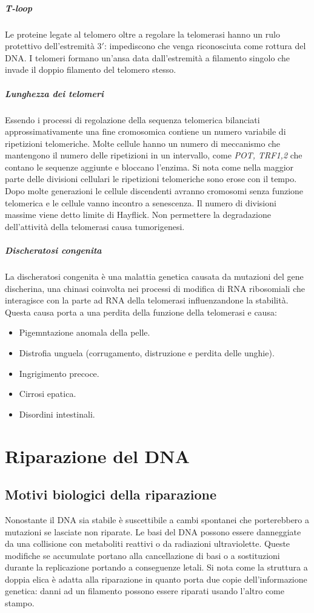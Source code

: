 				\subparagraph{T-loop}
				Le proteine legate al telomero oltre a regolare la telomerasi hanno un rulo protettivo dell'estremit\`a $3'$: impediscono che venga riconosciuta come rottura del DNA.
				I telomeri formano un'ansa data dall'estremit\`a a filamento singolo che invade il doppio filamento del telomero stesso.

				\subparagraph{Lunghezza dei telomeri}
				Essendo i processi di regolazione della sequenza telomerica bilanciati approssimativamente una fine cromosomica contiene un numero variabile di ripetizioni telomeriche.
				Molte cellule hanno un numero di meccanismo che mantengono il numero delle ripetizioni in un intervallo, come \emph{POT, TRF1,2} che contano le sequenze aggiunte e bloccano l'enzima.
				Si nota come nella maggior parte delle divisioni cellulari le ripetizioni telomeriche sono erose con il tempo.
				Dopo molte generazioni le cellule discendenti avranno cromosomi senza funzione telomerica e le cellule vanno incontro a senescenza.
				Il numero di divisioni massime viene detto limite di Hayflick.
				Non permettere la degradazione dell'attivit\`a della telomerasi causa tumorigenesi.

				\subparagraph{Discheratosi congenita}
				La discheratosi congenita \`e una malattia genetica causata da mutazioni del gene discherina, una chinasi coinvolta nei processi di modifica di RNA ribosomiali che interagisce con la parte ad RNA della telomerasi influenzandone la stabilit\`a.
				Questa causa porta a una perdita della funzione della telomerasi e causa:
				\begin{multicols}{2}
					\begin{itemize}
						\item Pigemntazione anomala della pelle.
						\item Distrofia unguela (corrugamento, distruzione e perdita delle unghie).
						\item Ingrigimento precoce.
						\item Cirrosi epatica.
						\item Disordini intestinali.
					\end{itemize}
				\end{multicols}

\section{Riparazione del DNA}

	\subsection{Motivi biologici della riparazione}
	Nonostante il DNA sia stabile \`e suscettibile a cambi spontanei che porterebbero a mutazioni se lasciate non riparate.
	Le basi del DNA possono essere danneggiate da una collisione con metaboliti reattivi o da radiazioni ultraviolette.
	Queste modifiche se accumulate portano alla cancellazione di basi o a sostituzioni durante la replicazione portando a conseguenze letali.
	Si nota come la struttura a doppia elica \`e adatta alla riparazione in quanto porta due copie dell'informazione genetica: danni ad un filamento possono essere riparati usando l'altro come stampo.

